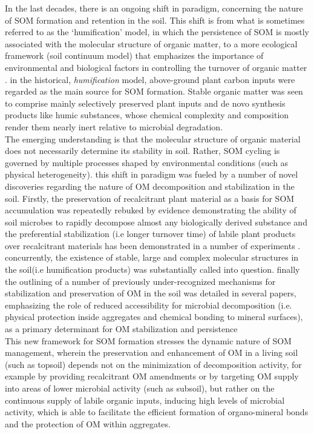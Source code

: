 \documentclass[12pt]{report}
\begin{document}
	 In the last  decades, there is an ongoing shift in  paradigm, concerning the nature of SOM formation and retention in the soil. This shift is from what is sometimes referred to as the ‘humification’ model, in which the persistence of SOM is mostly associated with the molecular structure of organic matter, to a more ecological framework (soil continuum model) that emphasizes the importance of environmental and biological factors in controlling the turnover of organic matter \citep{lehmann2015}. in the historical, \textit{humification} model, above-ground plant carbon inputs were regarded as the main source for SOM formation. Stable organic matter was seen to comprise mainly selectively preserved plant inputs and de novo synthesis products like humic substances, whose chemical complexity and composition render them nearly inert relative to microbial degradation.\\
	 The emerging understanding is that the molecular structure of organic material does not necessarily determine its stability in soil. Rather, SOM cycling is governed by multiple processes shaped by environmental conditions (such as physical heterogeneity)\citep{schmidt2011c}. this shift in paradigm was fueled by a number of novel discoveries regarding the nature of OM decomposition and stabilization in the soil. Firstly, the preservation of recalcitrant plant material as a basis for SOM accumulation was repeatedly rebuked by evidence demonstrating the ability of soil microbes to rapidly decompose almost any biologically derived substance \citep{dungait2012, marschner2008} and the preferential stabilization (i.e longer turnover time) of labile plant products over recalcitrant materials has been demonstrated in a number of experiments \citep{cotrufo2013, kleber2011}. concurrently, the existence of stable, large and complex molecular structures in the soil(i.e humification products) was substantially called into question\citep{kleber2010}. finally the outlining of a number of previously under-recognized mechanisms for stabilization and preservation of OM in the soil was detailed in several papers, emphasizing the role of reduced accessibility for microbial decomposition (i.e. physical protection inside aggregates and chemical bonding to mineral surfaces), as a primary determinant for OM stabilization and persistence\citep{lutzow2006, lutzow2008, ekschmitt2008}\.\\ 
	 This new framework for SOM formation stresses the dynamic nature of SOM management, wherein the preservation and enhancement of OM in a living soil (such as topsoil) depends not on the minimization of decomposition activity, for example by providing recalcitrant OM amendments or by targeting OM supply into areas of lower microbial activity (such as subsoil), but rather on the continuous supply of labile organic inputs, inducing high levels of microbial activity, which is able to facilitate the efficient formation of organo-mineral bonds and the protection of OM within aggregates\citep{dungait2012,barre2016,basler2015}.  
	 
\end{document}
